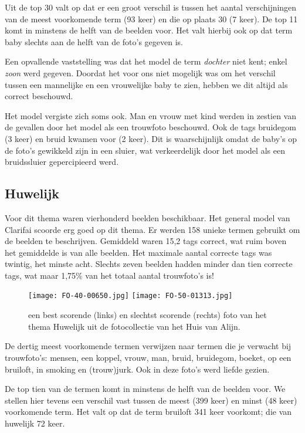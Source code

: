 Uit de top 30 valt op dat er een groot verschil is tussen het aantal verschijningen van de meest voorkomende term (93 keer) en die op plaats 30 (7 keer). De top 11 komt in minstens de helft van de beelden voor. Het valt hierbij ook op dat term baby slechts aan de helft van de foto’s gegeven is.

Een opvallende vaststelling was dat het model de term \textit{dochter} niet kent; enkel \textit{zoon} werd gegeven. Doordat het voor ons niet mogelijk was om het verschil tussen een mannelijke en een vrouwelijke baby te zien, hebben we dit altijd als correct beschouwd.

Het model vergiste zich soms ook. Man en vrouw met kind werden in zestien van de gevallen door het model als een trouwfoto beschouwd. Ook de tags bruidegom (3 keer) en bruid kwamen voor (2 keer). Dit is waarschijnlijk omdat de baby's op de foto's gewikkeld zijn in een sluier, wat verkeerdelijk door het model als een bruidssluier gepercipieerd werd.

\subsection{Huwelijk}
Voor dit thema waren vierhonderd beelden beschikbaar. Het general model van Clarifai scoorde erg goed op dit thema. Er werden 158 unieke termen gebruikt om de beelden te beschrijven. Gemiddeld waren 15,2 tags correct, wat ruim boven het gemiddelde is van alle beelden. Het maximale aantal correcte tags was twintig, het minste acht. Slechts zeven beelden hadden minder dan tien correcte tags, wat maar 1,75\% van het totaal aantal trouwfoto’s is!

\begin{figure}
	\centering
	\texttt{[image: FO-40-00650.jpg]}\hfill
	\texttt{[image: FO-50-01313.jpg]}\hfill
	\caption[Best en slechtst scorende foto van thema Huwelijk]{een best scorende (links) en slechtst scorende (rechts) foto van het thema Huwelijk uit de fotocollectie van het Huis van Alijn.}
\end{figure}

De dertig meest voorkomende termen verwijzen naar termen die je verwacht bij trouwfoto’s: mensen, een koppel, vrouw, man, bruid, bruidegom, boeket, op een bruiloft, in smoking en (trouw)jurk. Ook in deze foto’s werd liefde gezien. 

De top tien van de termen komt in minstens de helft van de beelden voor. We stellen hier tevens een verschil vast tussen de meest (399 keer) en minst (48 keer) voorkomende term. Het valt op dat de term bruiloft 341 keer voorkomt; die van huwelijk 72 keer.

